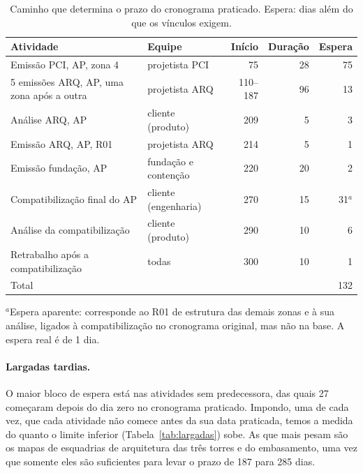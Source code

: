 \begin{table}[htbp]
  \centering
  \caption{Caminho que determina o prazo do cronograma praticado.
  Espera: dias além do que os vínculos exigem.}
  \label{tab:esperas}
  \small
  \begin{tabular}{llrrr}
    \toprule
    Atividade & Equipe & Início & Duração & Espera \\
    \midrule
    Emissão PCI, AP, zona 4 & projetista PCI & 75 & 28 & 75 \\
    5 emissões ARQ, AP, uma zona após a outra & projetista ARQ & 110--187 & 96 & 13 \\
    Análise ARQ, AP & cliente (produto) & 209 & 5 & 3 \\
    Emissão ARQ, AP, R01 & projetista ARQ & 214 & 5 & 1 \\
    Emissão fundação, AP & fundação e contenção & 220 & 20 & 2 \\
    Compatibilização final do AP & cliente (engenharia) & 270 & 15 & 31$^{a}$ \\
    Análise da compatibilização & cliente (produto) & 290 & 10 & 6 \\
    Retrabalho após a compatibilização & todas & 300 & 10 & 1 \\
    \midrule
    Total & & & & 132 \\
    \bottomrule
  \end{tabular}

  \smallskip
  \parbox{0.9\textwidth}{\footnotesize $^{a}$Espera aparente: corresponde
  ao R01 de estrutura das demais zonas e à sua análise, ligados à
  compatibilização no cronograma original, mas não na base. A espera real
  é de 1 dia.}
\end{table}

\paragraph{Largadas tardias.}
\label{sec:largadas}
O maior bloco de espera está nas atividades sem predecessora, das quais
27 começaram depois do dia zero no cronograma praticado. Impondo, uma de cada vez,
que cada atividade não comece antes da sua data praticada, temos a medida do quanto
o limite inferior (Tabela~\ref{tab:largadas}) sobe. As que mais pesam são os mapas de
esquadrias de arquitetura das três torres e do embasamento, uma vez que somente eles são suficientes para levar o prazo de 187 para 285 dias.

